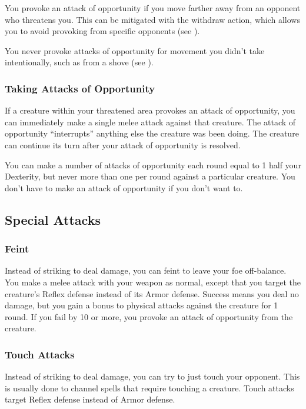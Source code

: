  You provoke an attack of opportunity if you move farther away from an opponent who threatens you. This can be mitigated with the withdraw action, which allows you to avoid provoking from specific opponents (see ).

 You never provoke attacks of opportunity for movement you didn't take intentionally, such as from a shove (see ).

\subsubsection{Taking Attacks of Opportunity}
If a creature within your threatened area provokes an attack of opportunity, you can immediately make a single melee attack against that creature. The attack of opportunity ``interrupts'' anything else the creature was been doing. The creature can continue its turn after your attack of opportunity is resolved.

You can make a number of attacks of opportunity each round equal to 1 \add half your Dexterity, but never more than one per round against a particular creature. You don't have to make an attack of opportunity if you don't want to.

\subsection{Special Attacks}

\subsubsection{Feint}\label{Feint}
Instead of striking to deal damage, you can feint to leave your foe off-balance. You make a melee attack with your weapon as normal, except that you target the creature's Reflex defense instead of its Armor defense. Success means you deal no damage, but you gain a  bonus to physical attacks against the creature for 1 round. If you fail by 10 or more, you provoke an attack of opportunity from the creature.

\subsubsection{Touch Attacks}\label{Touch Attacks}
Instead of striking to deal damage, you can try to just touch your opponent. This is usually done to channel spells that require touching a creature. Touch attacks target Reflex defense instead of Armor defense.


